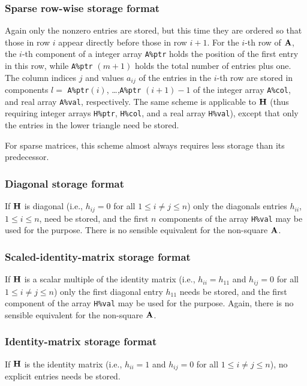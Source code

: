 \documentclass{galahad}
\begin{document}
\subsubsection{Sparse row-wise storage format}\label{rowwise}
Again only the nonzero entries are stored, but this time
they are ordered so that those in row $i$ appear directly before those
in row $i+1$. For the $i$-th row of ${\mathbf{A}}$, the $i$-th component of a
integer array {\tt A\%ptr} holds the position of the first entry in this row,
while {\tt A\%ptr} $(m+1)$ holds the total number of entries plus one.
The column indices $j$ and values $a_{ij}$ of the entries in the $i$-th row
are stored in components
$l =$ {\tt A\%ptr}$(i)$, \ldots ,{\tt A\%ptr} $(i+1)-1$ of the
integer array {\tt A\%col}, and real array {\tt A\%val}, respectively.
The same scheme is applicable to
${\mathbf{H}}$ (thus requiring integer arrays {\tt H\%ptr}, {\tt H\%col}, and
a real array {\tt H\%val}),
except that only the entries in the lower triangle need be stored.

For sparse matrices, this scheme almost always requires less storage than
its predecessor.

\subsubsection{Diagonal storage format}\label{diagonal}
If ${\mathbf{H}}$ is diagonal (i.e., $h_{ij} = 0$ for all $1 \leq i \neq j \leq n$)
only the diagonals entries $h_{ii}$, $1 \leq i \leq n$,  need be stored,
and the first $n$ components of the array {\tt H\%val} may be used for
the purpose. There is no sensible equivalent for the non-square ${\mathbf{A}}$.

\subsubsection{Scaled-identity-matrix storage format}\label{scaled-identity}
If ${\mathbf{H}}$ is a scalar multiple of the identity matrix
(i.e., $h_{ii} = h_{11}$  and $h_{ij} = 0$ for all $1 \leq i \neq j \leq n$)
only the first diagonal entry $h_{11}$ needs be stored,
and the first component of the array {\tt H\%val} may be used for
the purpose. Again, there is no sensible equivalent for the non-square ${\mathbf{A}}$.

\subsubsection{Identity-matrix storage format}\label{identity}
If ${\mathbf{H}}$ is the identity matrix
(i.e., $h_{ii} = 1$ and $h_{ij} = 0$ for all $1 \leq i \neq j \leq n$),
no explicit entries needs be stored.
\end{document}
